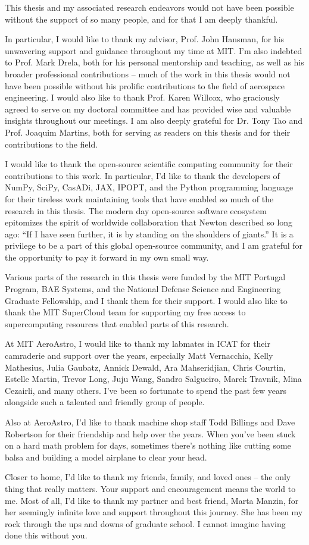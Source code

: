 This thesis and my associated research endeavors would not have been possible without the support of so many people, and for that I am deeply thankful.

In particular, I would like to thank my advisor, Prof. John Hansman, for his unwavering support and guidance throughout my time at MIT. I'm also indebted to Prof. Mark Drela, both for his personal mentorship and teaching, as well as his broader professional contributions -- much of the work in this thesis would not have been possible without his prolific contributions to the field of aerospace engineering. I would also like to thank Prof. Karen Willcox, who graciously agreed to serve on my doctoral committee and has provided wise and valuable insights throughout our meetings. I am also deeply grateful for Dr. Tony Tao and Prof. Joaquim Martins, both for serving as readers on this thesis and for their contributions to the field.

I would like to thank the open-source scientific computing community for their contributions to this work. In particular, I'd like to thank the developers of NumPy, SciPy, CasADi, JAX, IPOPT, and the Python programming language for their tireless work maintaining tools that have enabled so much of the research in this thesis. The modern day open-source software ecosystem epitomizes the spirit of worldwide collaboration that Newton described so long ago: ``If I have seen further, it is by standing on the shoulders of giants.'' It is a privilege to be a part of this global open-source community, and I am grateful for the opportunity to pay it forward in my own small way.

Various parts of the research in this thesis were funded by the MIT Portugal Program, BAE Systems, and the National Defense Science and Engineering Graduate Fellowship, and I thank them for their support. I would also like to thank the MIT SuperCloud team for supporting my free access to supercomputing resources that enabled parts of this research.

At MIT AeroAstro, I would like to thank my labmates in ICAT for their camraderie and support over the years, especially Matt Vernacchia, Kelly Mathesius, Julia Gaubatz, Annick Dewald, Ara Mahseridjian, Chris Courtin, Estelle Martin, Trevor Long, Juju Wang, Sandro Salgueiro, Marek Travnik, Mina Cezairli, and many others. I've been so fortunate to spend the past few years alongside such a talented and friendly group of people.

Also at AeroAstro, I'd like to thank machine shop staff Todd Billings and Dave Robertson for their friendship and help over the years. When you've been stuck on a hard math problem for days, sometimes there's nothing like cutting some balsa and building a model airplane to clear your head.


Closer to home, I'd like to thank my friends, family, and loved ones -- the only thing that really matters. Your support and encouragement means the world to me. Most of all, I'd like to thank my partner and best friend, Marta Manzin, for her seemingly infinite love and support throughout this journey. She has been my rock through the ups and downs of graduate school. I cannot imagine having done this without you.